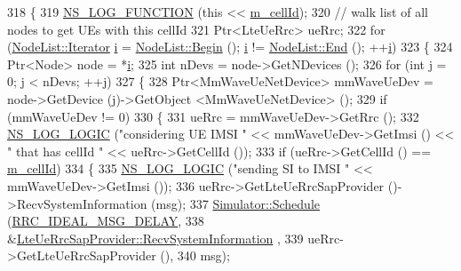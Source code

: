 \begin{DoxyCode}
318 \{
319   \hyperlink{log-macros-disabled_8h_a90b90d5bad1f39cb1b64923ea94c0761}{NS\_LOG\_FUNCTION} (\textcolor{keyword}{this} << \hyperlink{classns3_1_1MmWaveEnbRrcProtocolIdeal_a12f3d627baf0e8dfe3b83ce9fcf7a2f3}{m\_cellId});
320   \textcolor{comment}{// walk list of all nodes to get UEs with this cellId}
321   Ptr<LteUeRrc> ueRrc;
322   \textcolor{keywordflow}{for} (\hyperlink{classns3_1_1NodeList_a9e2679a94efb4f0066cc21e65440364d}{NodeList::Iterator} \hyperlink{bernuolliDistribution_8m_a6f6ccfcf58b31cb6412107d9d5281426}{i} = \hyperlink{classns3_1_1NodeList_a93d2211831f5cb71d1dbb721e2721d7f}{NodeList::Begin} (); 
      \hyperlink{bernuolliDistribution_8m_a6f6ccfcf58b31cb6412107d9d5281426}{i} != \hyperlink{classns3_1_1NodeList_a027a558c16e6078e25c7ffc67becb559}{NodeList::End} (); ++\hyperlink{bernuolliDistribution_8m_a6f6ccfcf58b31cb6412107d9d5281426}{i})
323     \{
324       Ptr<Node> node = *\hyperlink{bernuolliDistribution_8m_a6f6ccfcf58b31cb6412107d9d5281426}{i};
325       \textcolor{keywordtype}{int} nDevs = node->GetNDevices ();
326       \textcolor{keywordflow}{for} (\textcolor{keywordtype}{int} j = 0; j < nDevs; ++j)
327       \{
328         Ptr<MmWaveUeNetDevice> mmWaveUeDev = node->GetDevice (j)->GetObject <MmWaveUeNetDevice> ();
329         \textcolor{keywordflow}{if} (mmWaveUeDev != 0)
330         \{
331           ueRrc = mmWaveUeDev->GetRrc ();
332           \hyperlink{group__logging_ga88acd260151caf2db9c0fc84997f45ce}{NS\_LOG\_LOGIC} (\textcolor{stringliteral}{"considering UE IMSI "} << mmWaveUeDev->GetImsi () << \textcolor{stringliteral}{" that has cellId 
      "} << ueRrc->GetCellId ());
333           \textcolor{keywordflow}{if} (ueRrc->GetCellId () == \hyperlink{classns3_1_1MmWaveEnbRrcProtocolIdeal_a12f3d627baf0e8dfe3b83ce9fcf7a2f3}{m\_cellId})
334           \{
335             \hyperlink{group__logging_ga88acd260151caf2db9c0fc84997f45ce}{NS\_LOG\_LOGIC} (\textcolor{stringliteral}{"sending SI to IMSI "} << mmWaveUeDev->GetImsi ());
336             ueRrc->GetLteUeRrcSapProvider ()->RecvSystemInformation (msg);
337             \hyperlink{classns3_1_1Simulator_a671882c894a08af4a5e91181bf1eec13}{Simulator::Schedule} (\hyperlink{namespacens3_a491c1ae41d0f077411ab2b4e7ba7eca7}{RRC\_IDEAL\_MSG\_DELAY}, 
338                                  &\hyperlink{classns3_1_1LteUeRrcSapProvider_a34d16c5adabf7ee0caf111fd2b6bfbd3}{LteUeRrcSapProvider::RecvSystemInformation}
      ,
339                                  ueRrc->GetLteUeRrcSapProvider (), 
340                                  msg);          

\end{DoxyCode}

